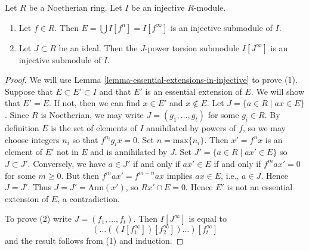 \begin{lemma}
\label{lemma-injective-module-divide}
Let $R$ be a Noetherian ring. Let $I$ be an injective $R$-module.
\begin{enumerate}
\item Let $f \in R$. Then $E = \bigcup I[f^n] = I[f^\infty]$
is an injective submodule of $I$.
\item Let $J \subset R$ be an ideal. Then the $J$-power torsion
submodule $I[J^\infty]$ is an injective submodule of $I$.
\end{enumerate}
\end{lemma}

\begin{proof}
We will use Lemma \ref{lemma-essential-extensions-in-injective}
to prove (1).
Suppose that $E \subset E' \subset I$ and that $E'$ is an essential
extension of $E$. We will show that $E' = E$. If not, then we can
find $x \in E'$ and $x \not \in E$.
Let $J = \{ a \in R \mid ax \in E\}$. Since $R$ is Noetherian,
we may write $J = (g_1, \ldots, g_t)$ for some
$g_i \in R$. By definition $E$ is the set of elements of $I$ annihilated
by powers of $f$, so we may choose integers $n_i$ so that $f^{n_i}g_ix = 0$.
Set $n = \mathrm{max}\{ n_i \}$. Then $x' = f^n x$ is an element of $E'$
not in $E$ and is annihilated by $J$. Set $J' = \{ a \in R \mid ax' \in E \}$
so $J \subset J'$. Conversely, we have $a \in J'$ if and only if $ax' \in E$
if and only if $f^m a x' = 0$ for some $m \geq 0$. But then
$f^m a x' = f^{m + n} a x$ implies $ax \in E$, i.e., $a \in J$.
Hence $J = J'$. Thus $J = J' = \text{Ann}(x')$, so $Rx' \cap E  = 0$.
Hence $E'$ is not an essential extension of $E$, a contradiction.

\medskip\noindent
To prove (2) write $J = (f_1, \ldots, f_t)$. Then
$I[J^\infty]$ is equal to
$$
(\ldots((I[f_1^\infty])[f_2^\infty])\ldots)[f_t^\infty]
$$
and the result follows from (1) and induction.
\end{proof}

